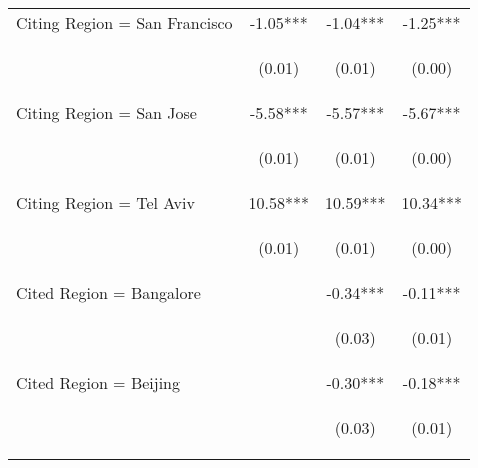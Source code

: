 \begin{center}
\begin{tabular}{lccc}
Citing Region = San Francisco & -1.05*** & -1.04*** & -1.25*** \\
\vspace{4pt} & \begin{footnotesize}(0.01)\end{footnotesize} & \begin{footnotesize}(0.01)\end{footnotesize} & \begin{footnotesize}(0.00)\end{footnotesize} \\
Citing Region = San Jose & -5.58*** & -5.57*** & -5.67*** \\
\vspace{4pt} & \begin{footnotesize}(0.01)\end{footnotesize} & \begin{footnotesize}(0.01)\end{footnotesize} & \begin{footnotesize}(0.00)\end{footnotesize} \\
Citing Region = Tel Aviv & 10.58*** & 10.59*** & 10.34*** \\
\vspace{4pt} & \begin{footnotesize}(0.01)\end{footnotesize} & \begin{footnotesize}(0.01)\end{footnotesize} & \begin{footnotesize}(0.00)\end{footnotesize} \\
Cited Region = Bangalore &  & -0.34*** & -0.11*** \\
\vspace{4pt} & \begin{footnotesize}\end{footnotesize} & \begin{footnotesize}(0.03)\end{footnotesize} & \begin{footnotesize}(0.01)\end{footnotesize} \\
Cited Region = Beijing &  & -0.30*** & -0.18*** \\
\vspace{4pt} & \begin{footnotesize}\end{footnotesize} & \begin{footnotesize}(0.03)\end{footnotesize} & \begin{footnotesize}(0.01)\end{footnotesize} \\

\end{tabular}
\end{center}
